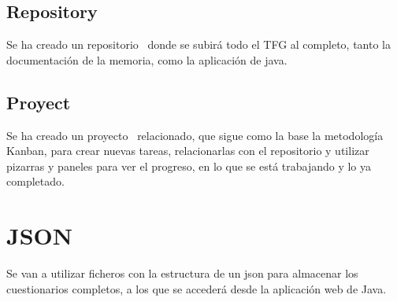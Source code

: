 \subsection{Repository}

Se ha creado un repositorio~\cite{github:repo} donde se subirá todo el TFG al completo, tanto la documentación de la memoria, como la aplicación de java.

\subsection{Proyect}

Se ha creado un proyecto~\cite{github:proyect} relacionado, que sigue como la base la metodología Kanban, para crear nuevas tareas, relacionarlas con el repositorio y utilizar pizarras y paneles para ver el progreso, en lo que se está trabajando y lo ya completado.

\section{JSON}

Se van a utilizar ficheros con la estructura de un json para almacenar los cuestionarios completos, a los que se accederá desde la aplicación web de Java.






